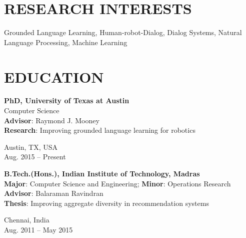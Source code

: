 \documentclass[letterpaper,10pt]{resume}
\author{\textcolor{grey}{Aishwarya Padmakumar}}
\begin{document}
\lsstyle
{
\resumeheader

\section{RESEARCH INTERESTS}
Grounded Language Learning, Human-robot-Dialog, Dialog Systems, Natural Language Processing, Machine Learning
\vspace{0.2cm}

\section{EDUCATION}

\begin{minipage}[t]{0.8\textwidth}
	{\sf \textbf{PhD, University of Texas at Austin}} \\
	Computer Science \\
	{\small \sf \textbf{Advisor}: Raymond J. Mooney} \\
	{\small \sf \textbf{Research}: Improving grounded language learning for robotics} \\	
	
\end{minipage}\begin{minipage}[t]{0.2\textwidth} 
	\begin{flushright}
		{\small \sf Austin, TX, USA} \\
		{\sf Aug. 2015 -- Present}
	\end{flushright}		
\end{minipage}
\vspace{0.3cm}

\begin{minipage}[t]{0.8\textwidth}
	{\sf \textbf{B.Tech.(Hons.), Indian Institute of Technology, Madras}} \\
	{\small \sf\textbf{Major}}: Computer Science and Engineering; {\small \sf\textbf{Minor}}: Operations Research \\
	{\small \sf \textbf{Advisor}: Balaraman Ravindran} \\
	{\small \sf \textbf{Thesis}: Improving aggregate diversity in recommendation systems} \\	
	
\end{minipage}\begin{minipage}[t]{0.2\textwidth} 
	\begin{flushright}
		{\small \sf Chennai, India} \\
		{\sf Aug. 2011 -- May 2015}
	\end{flushright}		
\end{minipage}
\vspace{0.1cm}


}
\end{document}
